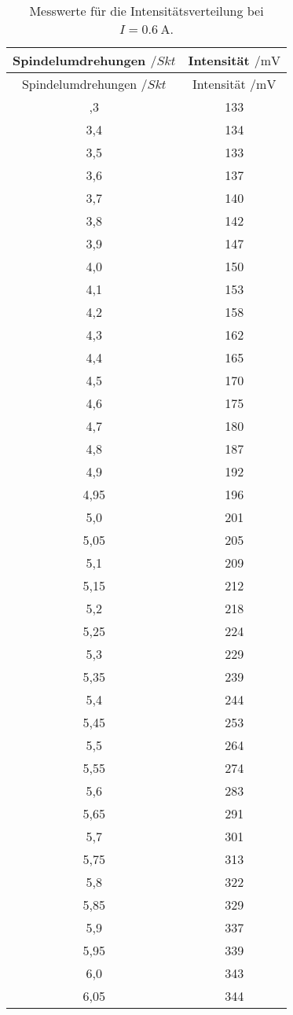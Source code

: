 \begin{longtable}{cc}
  \caption{Messwerte für die Intensitätsverteilung bei $I=\SI{0.6}{\ampere}$.}\\
  \hline
  \toprule
  Spindelumdrehungen $/Skt$ & Intensität $/\si{\milli\volt}$ \\
  \midrule
\endfirsthead
\toprule
Spindelumdrehungen $/Skt$ & Intensität $/\si{\milli\volt}$ \\
\midrule
\endhead
\bottomrule
\endfoot
\bottomrule
\bottomrule
\endlastfoot
3,3  & 133\\
3,4  & 134\\
3,5  & 133\\
3,6  & 137\\
3,7  & 140\\
3,8  & 142\\
3,9  & 147\\
4,0  & 150\\
4,1  & 153\\
4,2  & 158\\
4,3  & 162\\
4,4  & 165\\
4,5  & 170\\
4,6  & 175\\
4,7  & 180\\
4,8  & 187\\
4,9  & 192\\
4,95 & 196\\
5,0  & 201\\
5,05 & 205\\
5,1  & 209\\
5,15 & 212\\
5,2  & 218\\
5,25 & 224\\
5,3  & 229\\
5,35 & 239\\
5,4  & 244\\
5,45 & 253\\
5,5  & 264\\
5,55 & 274\\
5,6  & 283\\
5,65 & 291\\
5,7  & 301\\
5,75 & 313\\
5,8  & 322\\
5,85 & 329\\
5,9  & 337\\
5,95 & 339\\
6,0  & 343\\
6,05 & 344\\

\end{longtable}
